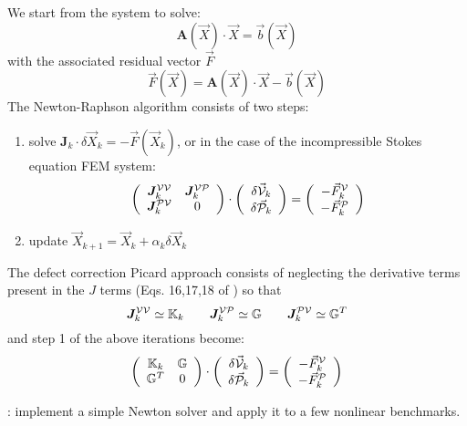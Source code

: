 We start from the system to solve:
\[
{\bm A}(\vec X) \cdot \vec X = \vec b(\vec X)
\]
with the associated residual vector $\vec F$ 
\[
\vec F(\vec X) = {\bm A}(\vec X) \cdot \vec X - \vec b(\vec X)
\]
The Newton-Raphson algorithm consists of two steps:
\begin{enumerate}
\item solve $\bm J_k \cdot \delta \vec X_k = -\vec F(\vec X_k)$, or in the 
case of the incompressible Stokes equation FEM system:
\[
\left(
\begin{array}{cc}
\bm J^{{\cal V}{\cal V}}_k & \bm J^{{\cal V}{\cal P}}_k \\
\bm J^{{\cal P}{\cal V}}_k & 0
\end{array}
\right)
\cdot
\left(
\begin{array}{c}
\delta \vec {\cal V}_k \\ \delta \vec {\cal P}_k
\end{array}
\right)
=
\left(
\begin{array}{c}
- \vec F_k^{\cal V} \\ -\vec F_k^{\cal P}
\end{array}
\right)
\]

\item update $\vec X_{k+1} = \vec X_k + \alpha_k \delta \vec X_k$
\end{enumerate}
The defect correction Picard approach consists of neglecting the derivative terms present 
in the $J$ terms (Eqs. 16,17,18 of \cite{frbt19}) so that 
\[
\bm J^{{\cal V}{\cal V}}_k \simeq {\mathbb{K}}_k 
\quad\quad
\bm J^{{\cal V}{\cal P}}_k \simeq {\mathbb{G}} 
\quad\quad
\bm J^{{\cal P}{\cal V}}_k \simeq {\mathbb{G}}^T
\]
and step 1 of the above iterations become:
\[
\left(
\begin{array}{cc}
{\mathbb{K}}_k & {\mathbb{G}} \\ {\mathbb{G}}^T & 0
\end{array}
\right)
\cdot
\left(
\begin{array}{c}
\delta \vec {\cal V}_k \\ \delta \vec {\cal P}_k
\end{array}
\right)
=
\left(
\begin{array}{c}
- \vec F_k^{\cal V} \\ -\vec F_k^{\cal P}
\end{array}
\right)
\]


\mscthesis: implement a simple Newton solver and apply it to a few nonlinear benchmarks.  

\vspace{1cm}


